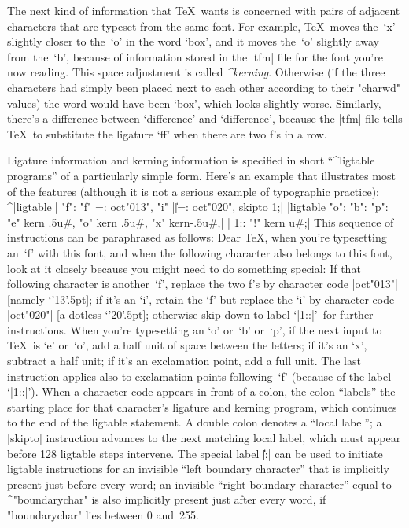 \medbreak
The next kind of information that \TeX\ wants is concerned with
pairs of adjacent characters that are typeset from the same font.
For example, \TeX\ moves the~`x' slightly closer to the~`o' in the
word `box', and it moves the~`o' slightly away from the~`b', because
of information stored in the |tfm| file for the font you're now reading.
This space adjustment is called {\sl^{kerning}}. Otherwise (if the
three characters had simply been placed next to each other according
to their "charwd" values) the word would have been `b{}o{}x', which
looks slightly worse. Similarly, there's a difference between
`difference' and `dif{\null}ference', because the |tfm| file tells \TeX\
to substitute the ligature `ff' when there are two f's in a row.

Ligature information and kerning information is specified in short
``^{ligtable programs}'' of a particularly simple form. Here's an example
that illustrates most of the features (although it is not a serious
example of typographic practice):
\beginlines
^|ligtable|| "f": "f" =: oct"013", "i" |\||=: oct"020", skipto 1;|
|ligtable "o": "b": "p": "e" kern .5u#, "o" kern .5u#, "x" kern-.5u#,|
|          1:: "!" kern u#;|
\endlines
This sequence of instructions can be paraphrased as follows:
\smallskip
\hangindent 3pc
Dear \TeX, when you're typesetting an~`f' with this font, and when the
following character also belongs to this font, look at it closely because
you might need to do something special: If that following character is
another~`f', replace the two f's by character code |oct"013"|
[namely `\char'13'\kern.5pt];
if it's an `i', retain the `f' but replace the `i' by character code
|oct"020"| [a dotless `\char'20'\kern.5pt];
otherwise skip down to label `|1::|'\ for further instructions.
When you're typesetting an `o' or~`b' or~`p', if the next input to \TeX\ is
`e' or~`o', add a half unit
of space between the letters; if it's an `x', subtract a half unit; if it's an
exclamation point, add a full unit. The last instruction applies also
to exclamation points following~`f' (because of the label `|1::|').
\smallskip\noindent
When a character code appears in front of a colon, the colon ``labels''
the starting place for that character's ligature and kerning program,
which continues to the end of the ligtable statement. A double colon denotes
a ``local label''; a |skipto| instruction advances to the next matching local
label, which must appear before 128 ligtable steps intervene. The special
label \|\||:| can be used to initiate ligtable instructions for an invisible
``left boundary character'' that is implicitly present just before every
word; an invisible ``right boundary character'' equal to ^"boundarychar" is
also implicitly present just after every word, if "boundarychar" lies between
0 and~255.

